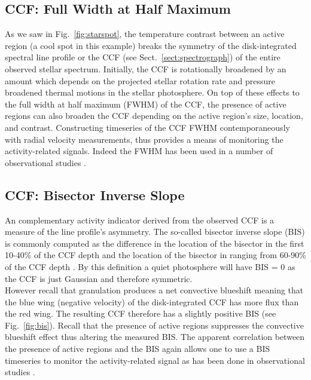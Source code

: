 \subsection{CCF: Full Width at Half Maximum} \label{sect:fwhm}
As we saw in Fig.~\ref{fig:starspot}, the temperature contrast between an active region 
(a cool spot in this example) breaks the symmetry of the disk-integrated spectral line profile 
or the CCF (see Sect.~\ref{sect:spectrograph}) of the entire observed stellar spectrum. Initially, 
the CCF is rotationally broadened by an amount which depends on the projected stellar 
rotation rate \vsini{} and pressure broadened thermal motions in the stellar photosphere. On top 
of these effects to the full width at half maximum (FWHM) of the CCF, the presence of active 
regions can also broaden the CCF depending on the active region's size, location, and contrast. 
Constructing timeseries of the CCF FWHM contemporaneously with radial velocity 
measurements, thus provides a 
means of monitoring the activity-related signals. Indeed the FWHM has been used in a number of 
observational studies \parencite[e.g.][]{queloz09, hatzes10}.

\subsection{CCF: Bisector Inverse Slope} \label{sect:bis}
An complementary activity indicator derived from the observed CCF is a measure of the line 
profile's 
asymmetry. The so-called bisector inverse slope (BIS) is commonly computed as the difference in 
the location of the bisector in the first 10-40\% of the CCF depth and the location of the 
bisector in ranging from 60-90\% of the CCF depth \parencite{dumusque14}. By this definition 
a quiet photosphere will have BIS = 0 \mps{} as the CCF is just Gaussian and therefore symmetric. \\

However recall that granulation produces a net convective blueshift meaning that the blue wing 
(negative velocity) of the disk-integrated CCF has more flux than the red wing. The resulting 
CCF therefore has a slightly positive BIS (see Fig.~\ref{fig:bis}). 
Recall that the presence of active regions 
suppresses the convective blueshift effect thus altering the measured BIS. The apparent correlation 
between the presence of active regions and the BIS again allows one to use a BIS timeseries to 
monitor the activity-related signal as has been done in observational studies 
\parencite[e.g.][]{queloz01}. \\

